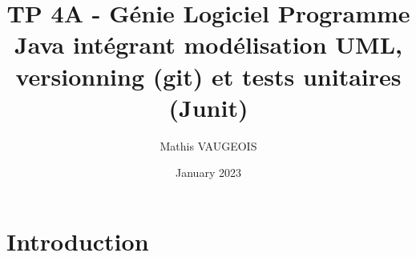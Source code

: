 \documentclass{article}
\title{TP 4A - Génie Logiciel
Programme Java intégrant modélisation UML, versionning (git)
et tests unitaires (Junit)
}
\author{Mathis VAUGEOIS}
\date{January 2023}
\begin{document}
\maketitle

\section{Introduction}
\end{document}
